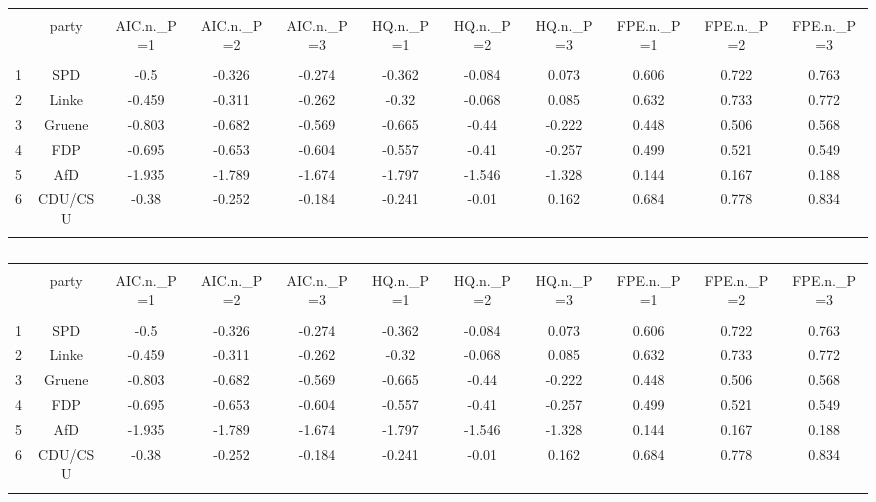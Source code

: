 
\begin{table}[!htbp] \centering 
  \caption{} 
  \label{} 
\begin{tabular}{@{\extracolsep{5pt}} ccccccccccc} 
\\[-1.8ex]\hline 
\hline \\[-1.8ex] 
 & party & AIC.n.\_P=1 & AIC.n.\_P=2 & AIC.n.\_P=3 & HQ.n.\_P=1 & HQ.n.\_P=2 & HQ.n.\_P=3 & FPE.n.\_P=1 & FPE.n.\_P=2 & FPE.n.\_P=3 \\ 
\hline \\[-1.8ex] 
1 & SPD & -0.5 & -0.326 & -0.274 & -0.362 & -0.084 & 0.073 & 0.606 & 0.722 & 0.763 \\ 
2 & Linke & -0.459 & -0.311 & -0.262 & -0.32 & -0.068 & 0.085 & 0.632 & 0.733 & 0.772 \\ 
3 & Gruene & -0.803 & -0.682 & -0.569 & -0.665 & -0.44 & -0.222 & 0.448 & 0.506 & 0.568 \\ 
4 & FDP & -0.695 & -0.653 & -0.604 & -0.557 & -0.41 & -0.257 & 0.499 & 0.521 & 0.549 \\ 
5 & AfD & -1.935 & -1.789 & -1.674 & -1.797 & -1.546 & -1.328 & 0.144 & 0.167 & 0.188 \\ 
6 & CDU/CSU & -0.38 & -0.252 & -0.184 & -0.241 & -0.01 & 0.162 & 0.684 & 0.778 & 0.834 \\ 
\hline \\[-1.8ex] 
\end{tabular} 
\end{table}  

\begin{table}[!htbp] \centering 
  \caption{} 
  \label{} 
\begin{tabular}{@{\extracolsep{5pt}} ccccccccccc} 
\\[-1.8ex]\hline 
\hline \\[-1.8ex] 
 & party & AIC.n.\_P=1 & AIC.n.\_P=2 & AIC.n.\_P=3 & HQ.n.\_P=1 & HQ.n.\_P=2 & HQ.n.\_P=3 & FPE.n.\_P=1 & FPE.n.\_P=2 & FPE.n.\_P=3 \\ 
\hline \\[-1.8ex] 
1 & SPD & -0.5 & -0.326 & -0.274 & -0.362 & -0.084 & 0.073 & 0.606 & 0.722 & 0.763 \\ 
2 & Linke & -0.459 & -0.311 & -0.262 & -0.32 & -0.068 & 0.085 & 0.632 & 0.733 & 0.772 \\ 
3 & Gruene & -0.803 & -0.682 & -0.569 & -0.665 & -0.44 & -0.222 & 0.448 & 0.506 & 0.568 \\ 
4 & FDP & -0.695 & -0.653 & -0.604 & -0.557 & -0.41 & -0.257 & 0.499 & 0.521 & 0.549 \\ 
5 & AfD & -1.935 & -1.789 & -1.674 & -1.797 & -1.546 & -1.328 & 0.144 & 0.167 & 0.188 \\ 
6 & CDU/CSU & -0.38 & -0.252 & -0.184 & -0.241 & -0.01 & 0.162 & 0.684 & 0.778 & 0.834 \\ 
\hline \\[-1.8ex] 
\end{tabular} 
\end{table}  
